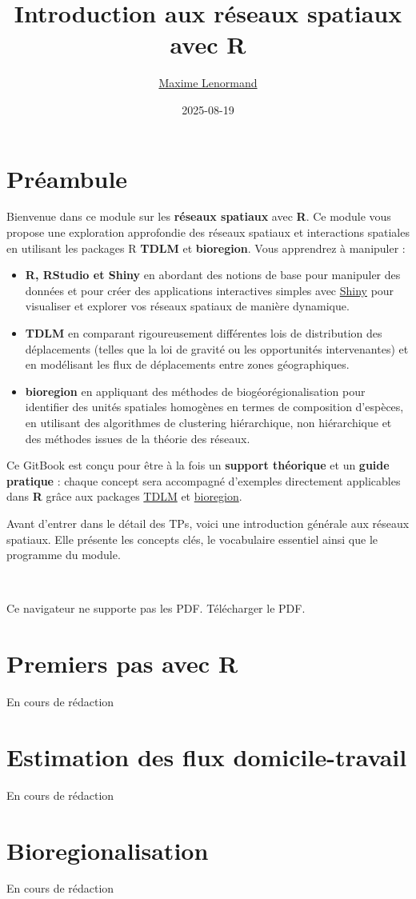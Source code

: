 \documentclass[
]{article}
\title{Introduction aux réseaux spatiaux avec R}
\author{\href{https://www.maximelenormand.com/}{Maxime Lenormand}}
\date{2025-08-19}
\begin{document}
\maketitle

{
\setcounter{tocdepth}{2}
\tableofcontents
}
\section*{Préambule}\label{preambule}

Bienvenue dans ce module sur les \textbf{réseaux spatiaux} avec \textbf{R}. Ce module vous
propose une exploration approfondie des réseaux spatiaux et interactions
spatiales en utilisant les packages R \textbf{TDLM} et \textbf{bioregion}. Vous apprendrez
à manipuler :

\begin{itemize}
\item
  \textbf{R, RStudio et Shiny} en abordant des
  notions de base pour manipuler des données et pour créer des applications
  interactives simples avec \href{https://shiny.posit.co/}{Shiny} pour visualiser et explorer vos réseaux
  spatiaux de manière dynamique.
\item
  \textbf{TDLM} en comparant rigoureusement différentes lois de distribution des
  déplacements (telles que la loi de gravité ou les opportunités intervenantes)
  et en modélisant les flux de déplacements entre zones géographiques.
\item
  \textbf{bioregion} en appliquant des méthodes de biogéorégionalisation pour
  identifier des unités spatiales homogènes en termes de composition d'espèces,
  en utilisant des algorithmes de clustering hiérarchique, non hiérarchique et
  des méthodes issues de la théorie des réseaux.
\end{itemize}

Ce GitBook est conçu pour être à la fois un \textbf{support théorique} et un
\textbf{guide pratique} : chaque concept sera accompagné d'exemples directement
applicables dans \textbf{R} grâce aux packages
\href{https://rtdlm.github.io/TDLM/}{TDLM} et
\href{https://biorgeo.github.io/bioregion/}{bioregion}.

Avant d'entrer dans le détail des TPs, voici une
introduction générale aux réseaux spatiaux. Elle présente les concepts clés,
le vocabulaire essentiel ainsi que le programme du module.

~

Ce navigateur ne supporte pas les PDF. Télécharger le PDF.

\section{Premiers pas avec R}\label{tp1}

En cours de rédaction

\section{Estimation des flux domicile-travail}\label{tp2}

En cours de rédaction

\section{Bioregionalisation}\label{tp3}

En cours de rédaction
\end{document}
